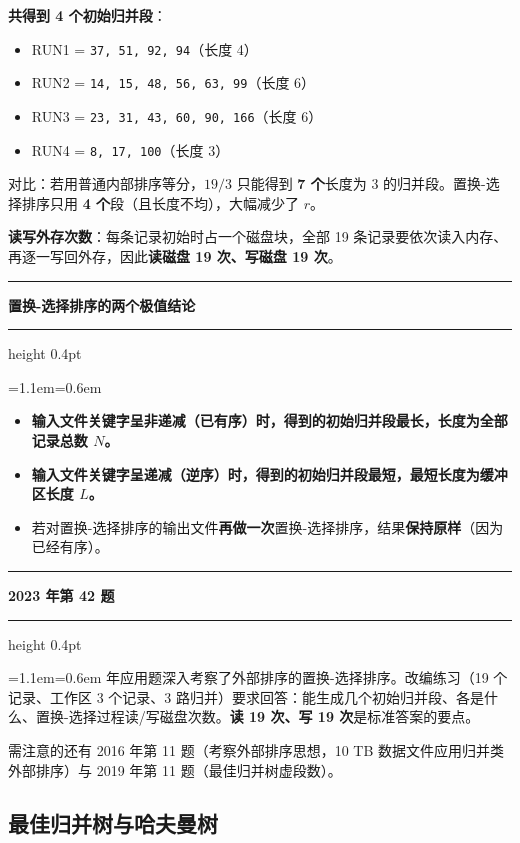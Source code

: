\documentclass[11pt,openany,UTF8]{ctexbook}
\newcommand{\callouthead}[2]{%
  \par\addvspace{7pt}\noindent
  {\color{#1}\rule[-0.15em]{3pt}{1.05em}}\hspace{0.5em}%
  {\bfseries\color{#1}#2}\par\nobreak\vspace{-0.35em}%
  {\color{rulesep}\hrule height 0.4pt}\nobreak\vspace{0.45em}%
  \begingroup\small\setlength{\parindent}{0pt}%
  \leftskip=1.1em\rightskip=0.6em\noindent\ignorespaces}
\newcommand{\calloutend}{\par\endgroup\addvspace{7pt}}
\newenvironment{callkey}[1]{\callouthead{keybar}{#1}}{\calloutend}
\newenvironment{callexam}[1]{\callouthead{exambar}{#1}}{\calloutend}
\begin{document}
\textbf{共得到 4 个初始归并段}：

\begin{itemize}
\item RUN1 = \texttt{37,\allowbreak{} 51,\allowbreak{} 92,\allowbreak{} 94}（长度 4）
\item RUN2 = \texttt{14,\allowbreak{} 15,\allowbreak{} 48,\allowbreak{} 56,\allowbreak{} 63,\allowbreak{} 99}（长度 6）
\item RUN3 = \texttt{23,\allowbreak{} 31,\allowbreak{} 43,\allowbreak{} 60,\allowbreak{} 90,\allowbreak{} 166}（长度 6）
\item RUN4 = \texttt{8,\allowbreak{} 17,\allowbreak{} 100}（长度 3）
\end{itemize}
对比：若用普通内部排序等分，$19/3$ 只能得到 \textbf{7 个}长度为 3 的归并段。置换-选择排序只用 \textbf{4 个}段（且长度不均），大幅减少了 $r$。

\textbf{读写外存次数}：每条记录初始时占一个磁盘块，全部 19 条记录要依次读入内存、再逐一写回外存，因此\textbf{读磁盘 19 次、写磁盘 19 次}。

\begin{callkey}{置换-选择排序的两个极值结论}
\begin{itemize}
\item \textbf{输入文件关键字呈非递减（已有序）时，得到的初始归并段最长，长度为全部记录总数 $N$。}
\item \textbf{输入文件关键字呈递减（逆序）时，得到的初始归并段最短，最短长度为缓冲区长度 $L$。}
\item 若对置换-选择排序的输出文件\textbf{再做一次}置换-选择排序，结果\textbf{保持原样}（因为已经有序）。
\end{itemize}
\end{callkey}

\begin{callexam}{2023 年第 42 题}
2023 年应用题深入考察了外部排序的置换-选择排序。改编练习（19 个记录、工作区 3 个记录、3 路归并）要求回答：能生成几个初始归并段、各是什么、置换-选择过程读/写磁盘次数。\textbf{读 19 次、写 19 次}是标准答案的要点。

需注意的还有 2016 年第 11 题（考察外部排序思想，10 TB 数据文件应用归并类外部排序）与 2019 年第 11 题（最佳归并树虚段数）。

\end{callexam}

\subsection{最佳归并树与哈夫曼树}
\end{document}
